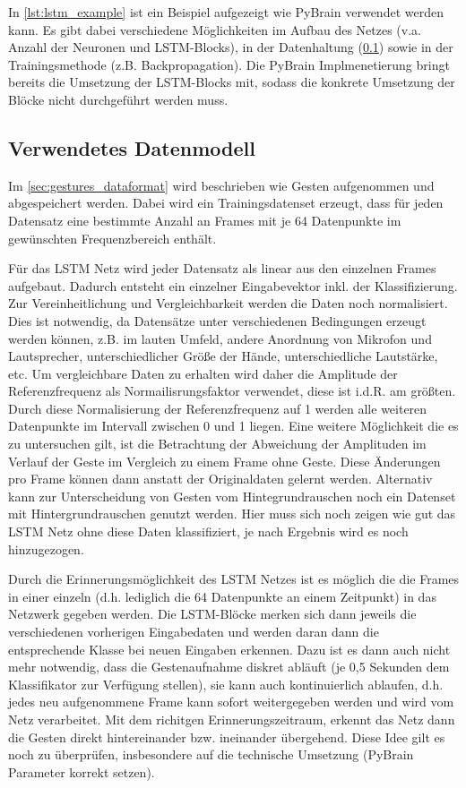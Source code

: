 In \autoref{lst:lstm_example} ist ein Beispiel aufgezeigt wie \ac{PyBrain}
verwendet werden kann. Es gibt dabei verschiedene Möglichkeiten im Aufbau des
Netzes (v.a. Anzahl der Neuronen und \ac{LSTM}-Blocks), in der Datenhaltung
(\ref{sec:lstm_data}) sowie in der Trainingsmethode (z.B. Backpropagation).
Die \ac{PyBrain} Implmenetierung bringt bereits die Umsetzung der
\ac{LSTM}-Blocks mit, sodass die konkrete Umsetzung der Blöcke nicht
durchgeführt werden muss.

\subsection{Verwendetes Datenmodell}
\label{sec:lstm_data}

Im \autoref{sec:gestures_dataformat} wird beschrieben wie Gesten aufgenommen und
abgespeichert werden. Dabei wird ein Trainingsdatenset erzeugt, dass für
jeden Datensatz eine bestimmte Anzahl an Frames mit je 64 Datenpunkte im
gewünschten Frequenzbereich enthält. 

Für das \ac{LSTM} Netz wird jeder Datensatz als linear aus den einzelnen Frames
aufgebaut. Dadurch entsteht ein einzelner Eingabevektor inkl. der
Klassifizierung. Zur Vereinheitlichung und Vergleichbarkeit werden die Daten
noch normalisiert.
Dies ist notwendig, da Datensätze unter verschiedenen Bedingungen erzeugt werden
können, z.B. im lauten Umfeld, andere Anordnung von Mikrofon und Lautsprecher,
unterschiedlicher Größe der Hände, unterschiedliche Lautstärke, etc. Um
vergleichbare Daten zu erhalten wird daher die Amplitude der Referenzfrequenz
als Normailisrungsfaktor verwendet, diese ist i.d.R. am größten. Durch diese
Normalisierung der Referenzfrequenz auf 1 werden alle weiteren Datenpunkte im
Intervall zwischen 0 und 1 liegen. Eine weitere Möglichkeit die es zu
untersuchen gilt, ist die Betrachtung der Abweichung der Amplituden im Verlauf
der Geste im Vergleich zu einem Frame ohne Geste. Diese Änderungen pro Frame
können dann anstatt der Originaldaten gelernt werden. Alternativ kann zur
Unterscheidung von Gesten vom Hintegrundrauschen noch ein Datenset mit
Hintergrundrauschen genutzt werden. Hier muss sich noch zeigen wie gut das
\ac{LSTM} Netz ohne diese Daten klassifiziert, je nach Ergebnis wird es noch
hinzugezogen. 

Durch die Erinnerungsmöglichkeit des \ac{LSTM} Netzes ist es möglich die die
Frames in einer einzeln (d.h. lediglich die 64 Datenpunkte an einem Zeitpunkt)
in das Netzwerk gegeben werden. Die \ac{LSTM}-Blöcke merken sich dann jeweils
die verschiedenen vorherigen Eingabedaten und werden daran dann die
entsprechende Klasse bei neuen Eingaben erkennen. Dazu ist es dann auch nicht
mehr notwendig, dass die Gestenaufnahme diskret abläuft (je 0,5 Sekunden dem
Klassifikator zur Verfügung stellen), sie kann auch kontinuierlich ablaufen,
d.h. jedes neu aufgenommene Frame kann sofort weitergegeben werden und wird vom
Netz verarbeitet. Mit dem richitgen Erinnerungszeitraum, erkennt das Netz dann
die Gesten direkt hintereinander bzw. ineinander übergehend. Diese Idee gilt es
noch zu überprüfen, insbesondere auf die technische Umsetzung (PyBrain
Parameter korrekt setzen).




\nocite{GERS2001,WIKI2013,Schmidhuber2013,LSTM1,Nerbonne1}